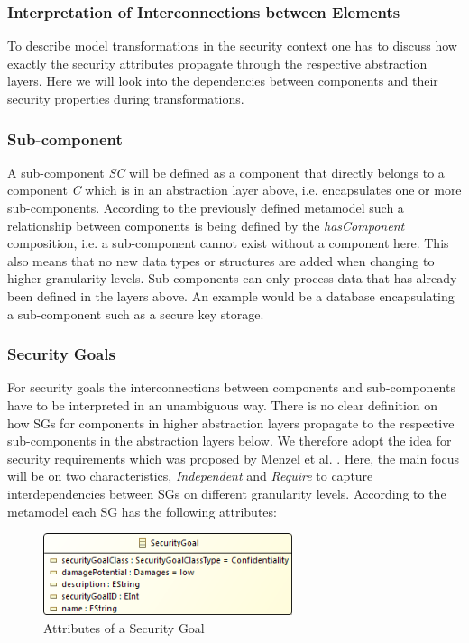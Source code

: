 \subsubsection{Interpretation of Interconnections between Elements}

To describe model transformations in the security context one has to discuss how exactly the security attributes propagate through the respective abstraction layers. Here we will look into the dependencies between components and their security properties during transformations.

\subsubsection*{Sub-component}
\label{subsubsec:sub_comp}
A sub-component \textit{SC} will be defined as a component that directly belongs to a component \textit{C} which is in an abstraction layer above, i.e. encapsulates one or more sub-components. According to the previously defined metamodel such a relationship between components is being defined by the \textit{hasComponent} composition, i.e. a sub-component cannot exist without a component here. This also means that no new data types or structures are added when changing to higher granularity levels. Sub-components can only process data that has already been defined in the layers above. An example would be a database encapsulating a sub-component such as a secure key storage.   

\subsubsection*{Security Goals}

For security goals the interconnections between components and sub-components have to be interpreted in an unambiguous way. There is no clear definition on how SGs for components in higher abstraction layers propagate to the respective sub-components in the abstraction layers below. We therefore adopt the idea for security requirements which was proposed by Menzel et al. \cite{Menzel2008}. Here, the main focus will be on two characteristics, \textit{Independent} and \textit{Require} to capture interdependencies between SGs on different granularity levels. According to the metamodel each SG has the following attributes:

\begin{figure}[H]
\centering
\includegraphics[width=0.65\textwidth]{pictures/securitygoal.png}
\caption{Attributes of a Security Goal}
\label{fig:security_goal}
\end{figure} 

